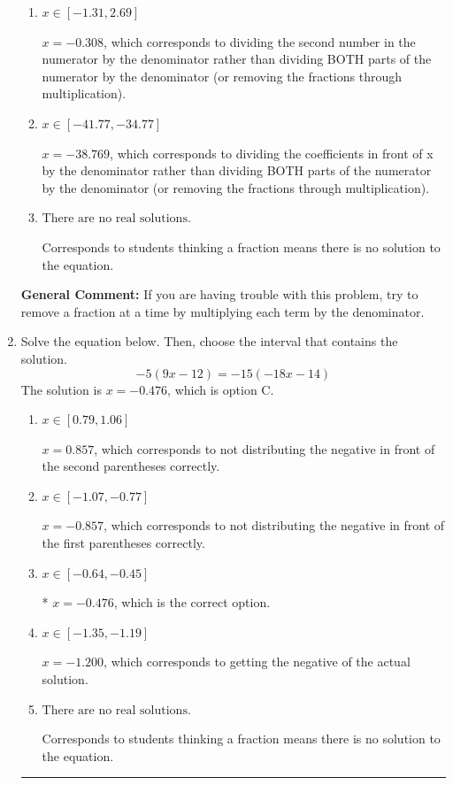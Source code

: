 \documentclass{extbook}[14pt]
\newcommand{\litem}[1]{\item #1

\rule{\textwidth}{0.4pt}}
\begin{document}
\begin{enumerate}
{\begin{enumerate}[label=\Alph*.]
* $x = -6.962$, which is the correct option.
\item \( x \in [-1.31, 2.69] \)

 $x = -0.308$, which corresponds to dividing the second number in the numerator by the denominator rather than dividing BOTH parts of the numerator by the denominator (or removing the fractions through multiplication).
\item \( x \in [-41.77, -34.77] \)

 $x = -38.769$, which corresponds to dividing the coefficients in front of x by the denominator rather than dividing BOTH parts of the numerator by the denominator (or removing the fractions through multiplication).
\item \( \text{There are no real solutions.} \)

Corresponds to students thinking a fraction means there is no solution to the equation.
\end{enumerate}

\textbf{General Comment:} If you are having trouble with this problem, try to remove a fraction at a time by multiplying each term by the denominator.
}
\litem{
Solve the equation below. Then, choose the interval that contains the solution.
\[ -5(9x -12) = -15(-18x -14) \]The solution is \( x = -0.476 \), which is option C.\begin{enumerate}[label=\Alph*.]
\item \( x \in [0.79, 1.06] \)

$x = 0.857$, which corresponds to not distributing the negative in front of the second parentheses correctly.
\item \( x \in [-1.07, -0.77] \)

$x = -0.857$, which corresponds to not distributing the negative in front of the first parentheses correctly.
\item \( x \in [-0.64, -0.45] \)

* $x = -0.476$, which is the correct option.
\item \( x \in [-1.35, -1.19] \)

$x = -1.200$, which corresponds to getting the negative of the actual solution.
\item \( \text{There are no real solutions.} \)

Corresponds to students thinking a fraction means there is no solution to the equation.
\end{enumerate}

}
\end{enumerate}
\end{document}
